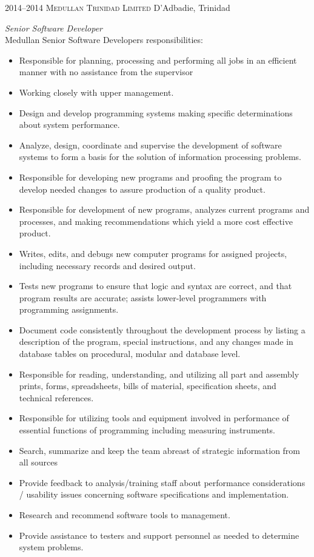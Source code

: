 \documentclass[]{friggeri-cv} %
\begin{document}
\begin{entrylist}
\entry
{2014--2014}
{\textsc{Medullan Trinidad Limited}}
{D'Adbadie, Trinidad}
{\emph{Senior Software Developer} \\
Medullan Senior Software Developers responsibilities: \\
\begin{itemize}
\item Responsible for planning, processing and performing all jobs in an efficient manner with no assistance from the supervisor
\item Working closely with upper management.
\item Design and develop programming systems making specific determinations about system performance.
\item Analyze, design, coordinate and supervise the development of software systems to form a basis for the solution of information processing problems.
\item Responsible for developing new programs and proofing the program to develop needed changes to assure production of a quality product.
\item Responsible for development of new programs, analyzes current programs and processes, and making recommendations which yield a more cost effective product.
\item Writes, edits, and debugs new computer programs for assigned projects, including necessary records and desired output.
\item Tests new programs to ensure that logic and syntax are correct, and that program results are accurate; assists lower-level programmers with programming assignments.
\item Document code consistently throughout the development process by listing a description of the program, special instructions, and any changes made in database tables on procedural, modular and database level.
\item Responsible for reading, understanding, and utilizing all part and assembly prints, forms, spreadsheets, bills of material, specification sheets, and technical references.
\item Responsible for utilizing tools and equipment involved in performance of essential functions of programming including measuring instruments.
\item Search, summarize and keep the team abreast of strategic information from all sources
\item Provide feedback to analysis/training staff about performance considerations / usability issues concerning software specifications and implementation.
\item Research and recommend software tools to management.
\item Provide assistance to testers and support personnel as needed to determine system problems.
\end{itemize}}
\end{entrylist}
\end{document}
